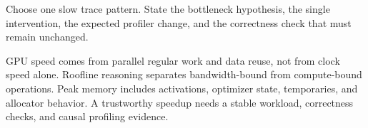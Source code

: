 \documentclass[handout]{beamer}
\begin{document}
  {Choose one slow trace pattern. State the bottleneck hypothesis, the single intervention, the expected profiler change, and the correctness check that must remain unchanged.}

\takeaways
  {GPU speed comes from parallel regular work and data reuse, not from clock speed alone.}
  {Roofline reasoning separates bandwidth-bound from compute-bound operations.}
  {Peak memory includes activations, optimizer state, temporaries, and allocator behavior.}
  {A trustworthy speedup needs a stable workload, correctness checks, and causal profiling evidence.}
\end{document}
